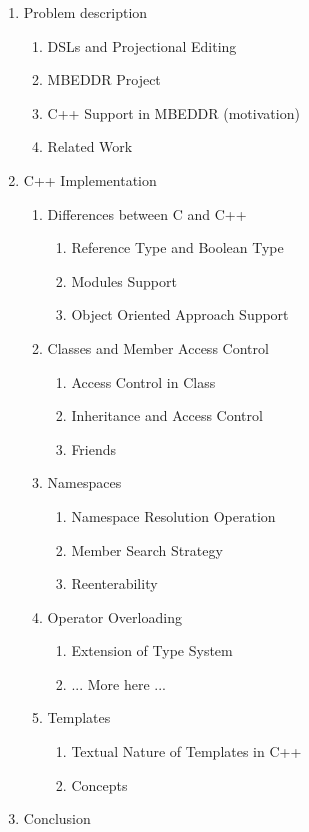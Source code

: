 \documentclass{article}
\begin{document}
\begin{enumerate}
  
  \item Problem description
  
  \begin{enumerate}
    \item DSLs and Projectional Editing
    \item MBEDDR Project
    \item C++ Support in MBEDDR (motivation)
    \item Related Work
  \end{enumerate}
  
  \item C++ Implementation
    \begin{enumerate}
      \item Differences between C and C++
	\begin{enumerate}
	 \item Reference Type and Boolean Type
	 \item Modules Support
	 \item Object Oriented Approach Support
	\end{enumerate}
      
      \item Classes and Member Access Control
	\begin{enumerate}
	 \item Access Control in Class
	 \item Inheritance and Access Control
	 \item Friends	 
	\end{enumerate}

      
      \item Namespaces
	\begin{enumerate}
	 \item Namespace Resolution Operation
	 \item Member Search Strategy
	 \item Reenterability
	\end{enumerate}

      \item Operator Overloading
	\begin{enumerate}
	 \item Extension of Type System
	 \item ... More here ...
	\end{enumerate}

      
      
      \item Templates  
      \begin{enumerate}
       \item Textual Nature of Templates in C++
       \item Concepts
      \end{enumerate}

    
    \end{enumerate}
  
  \item Conclusion 
  
\end{enumerate}
\end{document}

